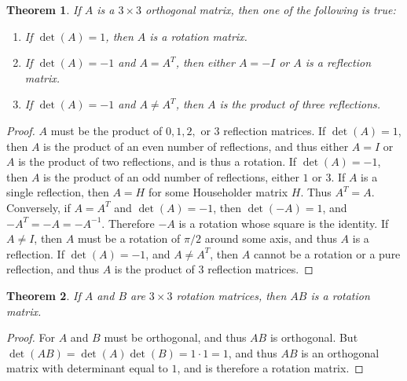 \documentclass{article}
\theoremstyle{mystyle}
\newtheorem{theorem}{Theorem}[section]
\begin{document}
\begin{theorem}
If $A$ is a $3\times 3$ orthogonal matrix, then one of the following is true:
\begin{enumerate}
\item If $\det(A) = 1$, then $A$ is a rotation matrix.
\item If $\det(A) = -1$ and $A=A^T$, then either $A=-I$ or $A$ is a reflection matrix.
\item If $\det(A) = -1$ and $A\ne A^T$, then $A$ is the product of three reflections.
\end{enumerate}
\end{theorem}
\begin{proof}
$A$ must be the product of $0,1,2,$ or $3$ reflection matrices. If $\det(A) = 1$, then $A$ is the product of an even number of reflections, and thus either $A=I$ or $A$ is the product of two reflections, and is thus a rotation. If $\det(A)=-1$, then $A$ is the product of an odd number of reflections, either $1$ or $3$. If $A$ is a single reflection, then $A=H$ for some Householder matrix $H$. Thus $A^T = A$. Conversely, if $A = A^T$ and $\det(A) = -1$, then $\det(-A) = 1$, and $-A^T = -A = -A^{-1}$. Therefore $-A$ is a rotation whose square is the identity. If $A\ne I$, then $A$ must be a rotation of $\pi/2$ around some axis, and thus $A$ is a reflection. If $\det(A) = -1$, and $A\ne A^T$, then $A$ cannot be a rotation or a pure reflection, and thus $A$ is the product of $3$ reflection matrices.
\end{proof}
\begin{theorem}
If $A$ and $B$ are $3\times 3$ rotation matrices, then $AB$ is a rotation matrix.
\end{theorem}
\begin{proof}
For $A$ and $B$ must be orthogonal, and thus $AB$ is orthogonal. But $\det(AB) = \det(A)\det(B) = 1\cdot 1 = 1$, and thus $AB$ is an orthogonal matrix with determinant equal to $1$, and is therefore a rotation matrix.
\end{proof}
\end{document}

